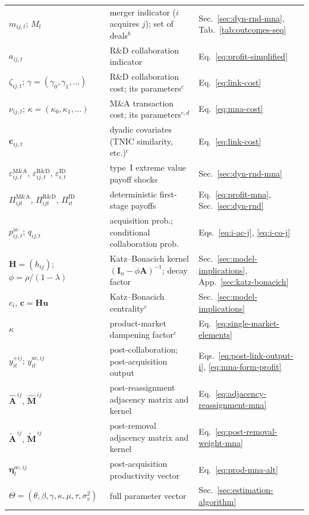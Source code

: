 \begin{table}[htbp]
{\begin{threeparttable}
{\begin{tabular}{@{} l l l @{}}
$m_{ij,t}$; $M_t$ & merger indicator ($i$ acquires $j$); set of deals$^{b}$ & Sec.~\ref{sec:dyn-rnd-mna}, Tab.~\ref{tab:outcomes-seq} \\
$a_{ij,t}$ & R\&D collaboration indicator & Eq.~\eqref{eq:profit-simplified} \\
$\zeta_{ij,t}$; $\gamma=(\gamma_0,\gamma_1,\dots)$ & R\&D collaboration cost; its parameters$^{c}$ & Eq.~\eqref{eq:link-cost} \\
$\nu_{ij,t}$; $\kappa=(\kappa_0,\kappa_1,\dots)$ & M\&A transaction cost; its parameters$^{c,d}$ & Eq.~\eqref{eq:mna-cost} \\
$\mathbf{c}_{ij,t}$ & dyadic covariates (TNIC similarity, etc.)$^{e}$ & Eq.~\eqref{eq:link-cost} \\
$\varepsilon^{\text{M\&A}}_{ij,t}$, $\varepsilon^{\text{R\&D}}_{ij,t}$, $\varepsilon^{\text{ID}}_{i,t}$ & type~I extreme value payoff shocks & Sec.~\ref{sec:dyn-rnd-mna} \\
$\Pi^{\text{M\&A}}_{ijt}$, $\Pi^{\text{R\&D}}_{ijt}$, $\Pi^{\text{ID}}_{it}$ & deterministic first-stage payoffs & Eq.~\eqref{eq:profit-mna}, Sec.~\ref{sec:dyn-rnd} \\
$p^{\mathrm{ac}}_{ij,t}$; $q_{ij,t}$ & acquisition prob.; conditional collaboration prob. & Eqs.~\eqref{eq:i-ac-j}, \eqref{eq:i-co-j} \\
$\mathbf{H}=(h_{ij})$; $\phi=\rho/(1-\lambda)$ & Katz--Bonacich kernel $(\mathbf{I}_n-\phi\mathbf{A})^{-1}$; decay factor & Sec.~\ref{sec:model-implications}, App.~\ref{sec:katz-bonacich} \\
$c_i$, $\mathbf{c}=\mathbf{H}\mathbf{u}$ & Katz--Bonacich centrality$^{e}$ & Sec.~\ref{sec:model-implications} \\
$\kappa$ & product-market dampening factor$^{c}$ & Eq.~\eqref{eq:single-market-elements} \\
$y^{+ij}_{it}$; $y^{ac,ij}_{it}$ & post-collaboration; post-acquisition output & Eqs.~\eqref{eq:post-link-output-i}, \eqref{eq:mna-form-profit} \\
$\widehat{\mathbf{A}}^{\,ij}$, $\widehat{\mathbf{M}}^{\,ij}$ & post-reassignment adjacency matrix and kernel & Eq.~\eqref{eq:adjacency-reassignment-mna} \\
$\widetilde{\mathbf{A}}^{\,ij}$, $\widetilde{\mathbf{M}}^{\,ij}$ & post-removal adjacency matrix and kernel & Eq.~\eqref{eq:post-removal-weight-mna} \\
$\bm{\eta}^{ac,ij}_t$ & post-acquisition productivity vector & Eq.~\eqref{eq:prod-mna-alt} \\
$\Theta=(\theta,\beta,\gamma,\kappa,\mu,\tau,\sigma^2_v)$ & full parameter vector & Sec.~\ref{sec:estimation-algorithm} \\

\end{tabular}}
\end{threeparttable}}
\end{table}
